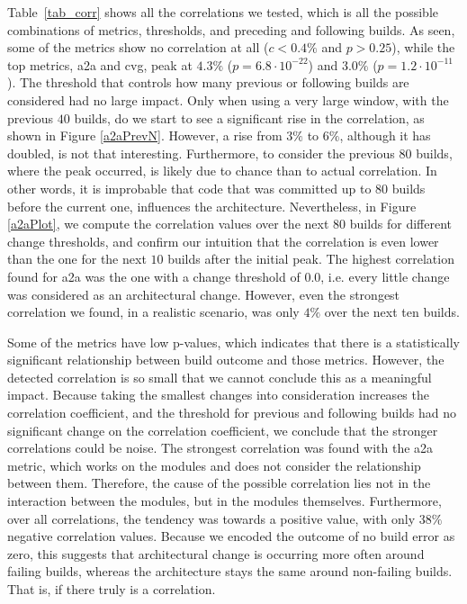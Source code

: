 \documentclass[sigconf, anonymous, review]{acmart}
\begin{document}
Table~\ref{tab_corr} shows all the correlations we tested, which is all the possible combinations of metrics, thresholds, and preceding and following builds. As seen, some of the metrics show no correlation at all ($c < 0.4\%$ and $p > 0.25$), while the top metrics, a2a and cvg, peak at $4.3\%$ ($p = 6.8 \cdot 10^{-22}$) and $3.0\%$ ($p=1.2 \cdot 10^{-11}$). 
The threshold that controls how many previous or following builds are considered had no large impact. Only when using a very large window, with the previous $40$ builds, do we start to see a significant rise in the correlation, as shown in Figure \ref{a2aPrevN}. However, a rise from $3\%$ to $6\%$, although it has doubled, is not that interesting. Furthermore, to consider the previous $80$ builds, where the peak occurred, is likely due to chance than to actual correlation. In other words, it is improbable that code that was committed up to $80$ builds before the current one, influences the architecture. 
Nevertheless, in Figure \ref{a2aPlot}, we compute the correlation values over the next $80$ builds for different change thresholds, and confirm our intuition that the correlation is even lower than the one for the next $10$ builds after the initial peak.
The highest correlation found for a2a was the one with a change threshold of $0.0$, i.e. every little change was considered as an architectural change. However, even the strongest correlation we found, in a realistic scenario, was only $4\%$ over the next ten builds.

Some of the metrics have low p-values, which indicates that there is a statistically significant relationship between build outcome and those metrics. However, the detected correlation is so small that we cannot conclude this as a meaningful impact. Because taking the smallest changes into consideration increases the correlation coefficient, and the threshold for previous and following builds had no significant change on the correlation coefficient, we conclude that the stronger correlations could be noise. 
The strongest correlation was found with the a2a metric, which works on the modules and does not consider the relationship between them. Therefore, the cause of the possible correlation lies not in the interaction between the modules, but in the modules themselves. Furthermore, over all correlations, the tendency was towards a positive value, with only $38\%$ negative correlation values. Because we encoded the outcome of no build error as zero, this suggests that architectural change is occurring more often around failing builds, whereas the architecture stays the same around non-failing builds. That is, if there truly is a correlation.
\end{document}
